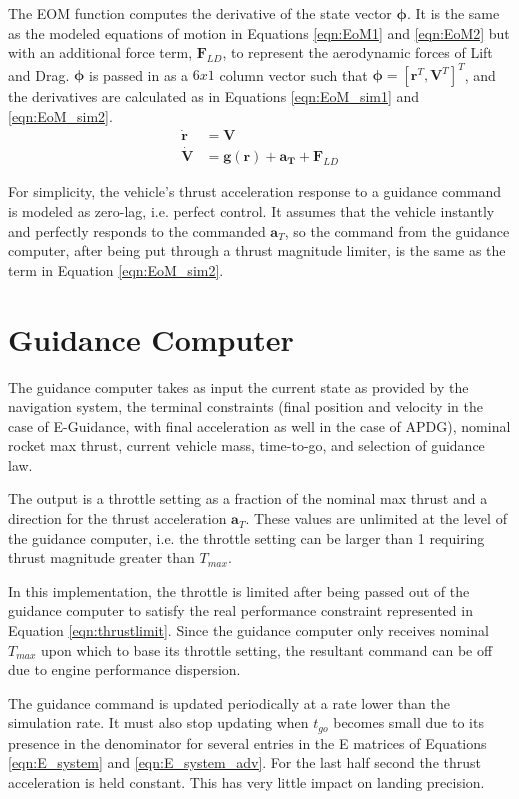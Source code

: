 The EOM function computes the derivative of the state vector $\bm{\phi}$. It is the same as the modeled equations of motion in Equations \ref{eqn:EoM1} and \ref{eqn:EoM2} but with an additional force term, $\bm{F}_{LD}$, to represent the aerodynamic forces of Lift and Drag. $\bm{\phi}$ is passed in as a $6x1$ column vector such that $\bm{\phi} = [\bm{r}^T,\bm{V}^T]^T$, and the derivatives are calculated as in Equations \ref{eqn:EoM_sim1} and \ref{eqn:EoM_sim2}.
\begin{align}
\label{eqn:EoM_sim1}
\bm{\dot{r}} &= \bm{V}\\
\label{eqn:EoM_sim2}
\bm{\dot{V}} &= \bm{g(r)} + \bm{a_T} + \bm{F}_{LD}
\end{align}

For simplicity, the vehicle's thrust acceleration response to a guidance command is modeled as zero-lag, i.e. perfect control. It assumes that the vehicle instantly and perfectly responds to the commanded $\bm{a}_T$, so the command from the guidance computer, after being put through a thrust magnitude limiter, is the same as the term in Equation \ref{eqn:EoM_sim2}.

\section{Guidance Computer} \label{sec:guidancecomp}
The guidance computer takes as input the current state as provided by the navigation system, the terminal constraints (final position and velocity in the case of E-Guidance, with final acceleration as well in the case of APDG), nominal rocket max thrust, current vehicle mass, time-to-go, and selection of guidance law.

The output is a throttle setting as a fraction of the nominal max thrust and a direction for the thrust acceleration $\bm{a}_T$. These values are unlimited at the level of the guidance computer, i.e. the throttle setting can be larger than 1 requiring thrust magnitude greater than $T_{max}$. 

In this implementation, the throttle is limited after being passed out of the guidance computer to satisfy the real performance constraint represented in Equation \ref{eqn:thrustlimit}. Since the guidance computer only receives nominal $T_{max}$ upon which to base its throttle setting, the resultant command can be off due to engine performance dispersion.

The guidance command is updated periodically at a rate lower than the simulation rate. It must also stop updating when $t_{go}$ becomes small due to its presence in the denominator for several entries in the E matrices of Equations \ref{eqn:E_system} and \ref{eqn:E_system_adv}. For the last half second the thrust acceleration is held constant. This has very little impact on landing precision.

